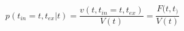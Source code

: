 \begin{equation}
p(t_{in}=t,t_{ex}|t)  = \frac{v(t,t_{in}=t,t_{ex})}{V(t)}= \frac{F(t,t_)}{V(t)}
\end{equation}\begin{equation}

\end{equation}